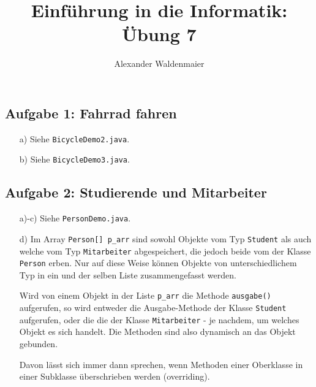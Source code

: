\documentclass{article}
\title{Einführung in die Informatik: Übung 7}
\author{Alexander Waldenmaier}
\begin{document}
    \maketitle

    \subsection*{Aufgabe 1: Fahrrad fahren}
    \begin{enumerate}
        \item[a)] Siehe \texttt{BicycleDemo2.java}.
        \item[b)] Siehe \texttt{BicycleDemo3.java}.
    \end{enumerate}


    \subsection*{Aufgabe 2: Studierende und Mitarbeiter}
    \begin{enumerate}
        \item[a)-c)] Siehe \texttt{PersonDemo.java}.
        \item[d)] Im Array \texttt{Person[] p\_arr} sind sowohl Objekte vom Typ \texttt{Student} als auch welche vom Typ \texttt{Mitarbeiter} abgespeichert, die jedoch beide vom der Klasse \texttt{Person} erben. Nur auf diese Weise können Objekte von unterschiedlichem Typ in ein und der selben Liste zusammengefasst werden. 
    
        Wird von einem Objekt in der Liste \texttt{p\_arr} die Methode \texttt{ausgabe()} aufgerufen, so wird entweder die Ausgabe-Methode der Klasse \texttt{Student} aufgerufen, oder die die der Klasse \texttt{Mitarbeiter} - je nachdem, um welches Objekt es sich handelt. Die Methoden sind also dynamisch an das Objekt gebunden. 

        Davon lässt sich immer dann sprechen, wenn Methoden einer Oberklasse in einer Subklasse überschrieben werden (overriding).  
    \end{enumerate}
\end{document}
